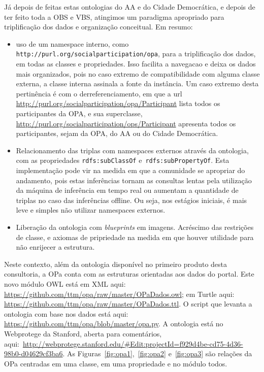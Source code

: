 \documentclass[12pt]{article}
\begin{document}
Já depois de feitas estas ontologias do AA e do Cidade Democrática, e depois de ter feito toda a OBS e VBS, atingimos um paradigma apropriado para triplificação dos dados e organização conceitual. Em resumo:
\begin{itemize}
    \item uso de um namespace interno, como \texttt{http://purl.org/socialparticipation/opa}, para a triplificação dos dados, em todas as classes e propriedades. Isso facilita a navegacao e deixa os dados mais organizados, pois no caso extremo de compatibilidade com alguma classe externa, a classe interna assinala a fonte da instância. Um caso extremo desta pertinência é com o derreferenciamento, em que a url \url{http://purl.org/socialparticipation/opa/Participant} lista todos os participantes da OPA, e sua superclasse, \url{http://purl.org/socialparticipation/ops/Participant} apresenta todos os participantes, sejam da OPA, do AA ou do Cidade Democrática.
    \item Relacionamento das triplas com namespaces externos através da ontologia, com as propriedades \texttt{rdfs:subClassOf} e~\texttt{rdfs:subPropertyOf}. Esta implementação pode vir na medida em que a comunidade se apropriar do andamento, pois estas inferências tornam as consultas lentas pela utilização da máquina de inferência em tempo real ou aumentam a quantidade de triplas no caso das inferências offline. Ou seja, nos estágios iniciais, é mais leve e simples não utilizar namespaces externos.
    \item Liberação da ontologia com \emph{blueprints} em imagens. Acréscimo das restrições de classe, e axiomas de pripriedade na medida em que houver utilidade para não enrijecer a estrutura.
\end{itemize}

Neste contexto, além da ontologia disponível no primeiro produto desta consultoria, a OPa conta com as estruturas orientadas aos dados do portal. Este novo módulo OWL está em XML aqui: \url{https://github.com/ttm/opa/raw/master/OPaDados.owl}; em Turtle aqui: \url{https://github.com/ttm/opa/raw/master/OPaDados.ttl}. O script que levanta a ontologia com base nos dados está aqui: \url{https://github.com/ttm/opa/blob/master/opa.py}. A ontologia está no Webprotege da Stanford, aberta para comentários, aqui:~\url{http://webprotege.stanford.edu/#Edit:projectId=f929d4be-cd75-4d36-98b0-d04629cf3ba6}. As Figuras~\ref{fig:opa1},~\ref{fig:opa2} e~\ref{fig:opa3} são relações da OPa centradas em uma classe, em uma propriedade e no módulo todos.
\end{document}
